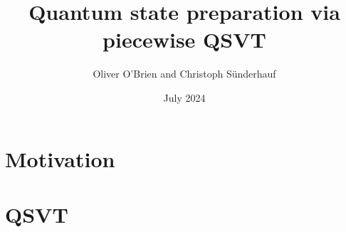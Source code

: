 \documentclass{beamer}
\title[Piecewise QSVT Data Loading]{Quantum state preparation via piecewise QSVT\footfullcite{obrien2024quantumstatepreparationpiecewise}}
\author[O. O'Brien, C. Sünderhauf] %
{Oliver O'Brien and Christoph Sünderhauf}
\institute{Riverlane}
\date{July 2024}
\begin{document}
\frame{\titlepage}
\section{Motivation}

\section{QSVT}
\end{document}
